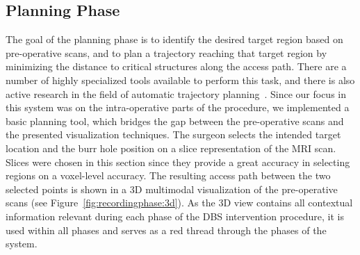 \documentclass[review]{vgtc}                 %
\begin{document}
\subsection{Planning Phase}\label{sec:overview:planning}
The goal of the planning phase is to identify the desired target region based on pre-operative scans, and to plan a trajectory reaching that target region by minimizing the distance to critical structures along the access path. There are a number of highly specialized tools available to perform this task, and there is also active research in the field of automatic trajectory planning~\cite{Shamir2010}. Since our focus in this system was on the intra-operative parts of the procedure, we implemented a basic planning tool, which bridges the gap between the pre-operative scans and the presented visualization techniques. The surgeon selects the intended target location and the burr hole position on a slice representation of the MRI scan. Slices were chosen in this section since they provide a great accuracy in selecting regions on a voxel-level accuracy. The resulting access path between the two selected points is shown in a 3D multimodal visualization of the pre-operative scans (see Figure~\ref{fig:recordingphase:3d}). As the 3D view contains all contextual information relevant during each phase of the DBS intervention procedure, it is used within all phases and serves as a red thread through the phases of the system.
%
%
\end{document}
